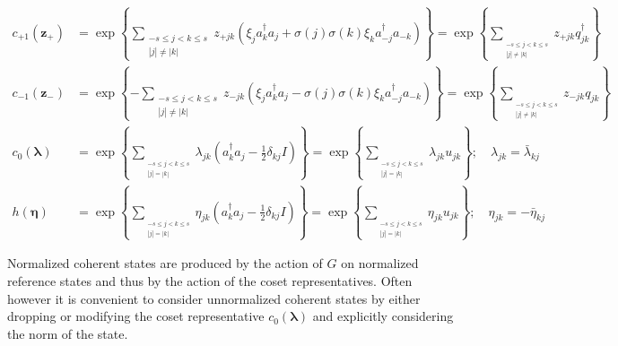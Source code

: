 \documentclass[aps,preprint]{revtex4}%
\begin{document}
\begin{align}
c_{+1}\left(  \mathbf{z}_{+}\right)   &  =\exp\left\{  \sum
\limits_{\substack{-s\leq j<k\leq s\\\left\vert j\right\vert \neq\left\vert
k\right\vert }}z_{+jk}\left(  \xi_{j}a_{k}^{\dagger}a_{j}+\sigma\left(
j\right)  \sigma\left(  k\right)  \xi_{k}a_{-j}^{\dagger}a_{-k}\right)
\right\}  =\exp\left\{  \sum\limits_{_{\substack{-s\leq j<k\leq s\\\left\vert
j\right\vert \neq\left\vert k\right\vert }}}z_{+jk}q_{jk}^{\dagger}\right\}
\\
c_{-1}\left(  \mathbf{z}_{-}\right)   &  =\exp\left\{  -\sum
\limits_{\substack{-s\leq j<k\leq s\\\left\vert j\right\vert \neq\left\vert
k\right\vert }}z_{-jk}\left(  \xi_{j}a_{k}^{\dagger}a_{j}-\sigma\left(
j\right)  \sigma\left(  k\right)  \xi_{k}a_{-j}^{\dagger}a_{-k}\right)
\right\}  =\exp\left\{  \sum\limits_{_{\substack{-s\leq j<k\leq s\\\left\vert
j\right\vert \neq\left\vert k\right\vert }}}z_{-jk}q_{jk}\right\}  \\
c_{0}\left(  \mathbf{\lambda}\right)   &  =\exp\left\{  \sum
\limits_{_{\substack{-s\leq j<k\leq s\\\left\vert j\right\vert =\left\vert
k\right\vert }}}\lambda_{jk}\left(  a_{k}^{\dagger}a_{j}-\frac{1}{2}%
\delta_{kj}I\right)  \right\}  =\exp\left\{  \sum\limits_{_{\substack{-s\leq
j<k\leq s\\\left\vert j\right\vert =\left\vert k\right\vert }}}\lambda
_{jk}u_{jk}\right\}  ;\quad\lambda_{jk}=\bar{\lambda}_{kj}\\
h\left(  \mathbf{\eta}\right)   &  =\exp\left\{  \sum
\limits_{_{\substack{-s\leq j<k\leq s\\\left\vert j\right\vert =\left\vert
k\right\vert }}}\eta_{jk}\left(  a_{k}^{\dagger}a_{j}-\frac{1}{2}\delta
_{kj}I\right)  \right\}  =\exp\left\{  \sum\limits_{_{\substack{-s\leq j<k\leq
s\\\left\vert j\right\vert =\left\vert k\right\vert }}}\eta_{jk}%
u_{jk}\right\}  ;\quad\eta_{jk}=-\bar{\eta}_{kj}%
\end{align}


Normalized coherent states are produced by the action of $G$ on normalized
reference states and thus by the action of the coset representatives. Often
however it is convenient to consider unnormalized coherent states by either
dropping or modifying the coset representative $c_{0}\left(  \mathbf{\lambda
}\right)  $ and explicitly considering the norm of the state.
\end{document}
